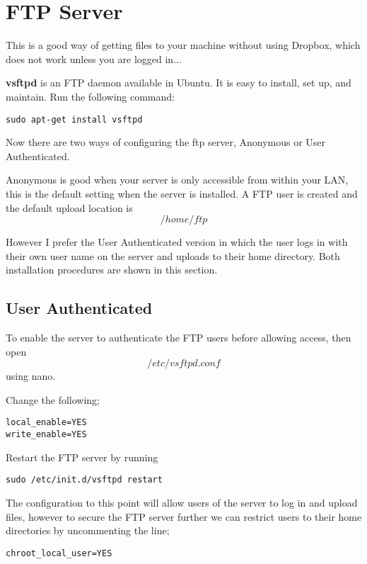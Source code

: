\chapter{FTP Server}

This is a good way of getting files to your machine without using Dropbox, which does not work unless you are logged in...

\textbf{vsftpd} is an FTP daemon available in Ubuntu. It is easy to install, set up, and maintain. Run the following command:

\begin{lstlisting}
sudo apt-get install vsftpd
\end{lstlisting}

Now there are two ways of configuring the ftp server, Anonymous or User Authenticated.

Anonymous is good when your server is only accessible from within your LAN, this is the default setting when the server is installed.  A FTP user is created and the default upload location is
$$
/home/ftp
$$

However I prefer the User Authenticated version in which the user logs in with their own user name on the server and uploads to their home directory.  Both installation procedures are shown in this section.

\section{User Authenticated}

To enable the server to authenticate the FTP users before allowing access, then open $$/etc/vsftpd.conf$$ using nano.

Change the following;

\begin{lstlisting}
local_enable=YES
write_enable=YES
\end{lstlisting}

Restart the FTP server by running

\begin{lstlisting}
sudo /etc/init.d/vsftpd restart
\end{lstlisting}

The configuration to this point will allow users of the server to log in and upload files, however to secure the FTP server further we can restrict users to their home directories by uncommenting the line;

\begin{lstlisting}
chroot_local_user=YES
\end{lstlisting}

